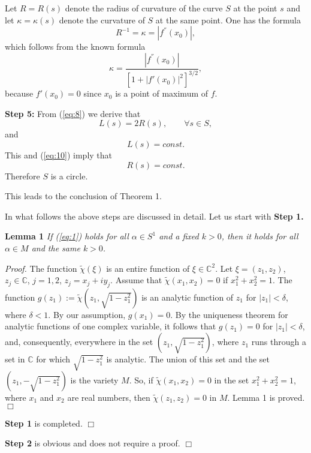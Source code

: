 \documentclass[final,11pt]{article}
\def\C{\mathbb{C}}
\begin{document}
Let $R=R(s)$ denote the radius of curvature of the curve $S$ at the point $s$ and
let $\kappa=\kappa (s)$ denote the curvature of $S$ at the same point.  One has the formula
 \begin{equation}\label{eq:9'}
R^{-1}=\kappa=|f^{''}(x_0)|,
\end{equation}
which follows from the known formula
$$\kappa=\frac{|f^{''}(x_0)|}{[1+|f'(x_0)|^2]^{3/2}},$$
because $f'(x_0)=0$ since $x_0$ is a point of maximum of $f$.


{\bf Step 5:} From   (\ref{eq:8}) we derive that
\begin{equation}\label{eq:10}
L(s)=2R(s), \qquad \forall s\in S,
\end{equation}
and
\begin{equation}\label{eq:11}
L(s)=const.
\end{equation}
This and  (\ref{eq:10}) imply that
\begin{equation}\label{eq:12}
R(s)=const.
\end{equation}
Therefore $S$ is a circle.

This leads to the conclusion of Theorem 1.

In what follows the above steps are discussed in detail. Let us start
with {\bf Step 1.}

{\bf Lemma 1} {\it If (\ref{eq:1}) holds for all $\alpha\in S^1$
and a fixed $k>0$, then it holds for all $\alpha\in M$ and the same
$k>0$.}

{\it Proof.} The function $\tilde{\chi}(\xi)$ is an entire function
of $\xi\in \C^2$. Let $\xi=(z_1,z_2)$, $z_j\in \C$, $j=1,2$,
$z_j=x_j+iy_j$. Assume that $\tilde{\chi}(x_1,x_2)=0$ if $x_1^2+x_2^2=1$.
The function $g(z_1):=\tilde{\chi}(z_1, \sqrt{1-z_1^2})$ is an analytic
function of $z_1$ for $|z_1|<\delta$, where $\delta<1$. By our assumption,
$g(x_1)=0$. By the uniqueness theorem for analytic functions of one
complex variable, it follows that $g(z_1)=0$ for $|z_1|<\delta$,
 and, consequently, everywhere in the set $(z_1, \sqrt{1-z_1^2})$, where
$z_1$ runs through a set in $\C$ for which $\sqrt{1-z_1^2}$ is analytic.
The union of this set and the set $(z_1, -\sqrt{1-z_1^2})$ is the
variety $M$. So, if $\tilde{\chi}(x_1,x_2)=0$ in the set $x_1^2+x_2^2=1$,
where $x_1$ and $x_2$ are real numbers,
then $\tilde{\chi}(z_1,z_2)=0$ in $M$. Lemma 1 is proved.
\hfill $\Box$

{\bf Step 1} is completed. \hfill $\Box$

{\bf Step 2} is obvious and does not require a proof. \hfill $\Box$
\end{document}
